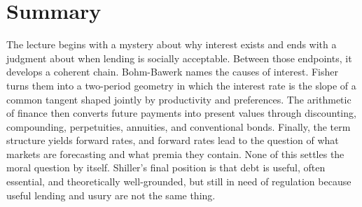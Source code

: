 \section{Summary}

The lecture begins with a mystery about why interest exists and ends with a judgment about when lending is socially acceptable. Between those endpoints, it develops a coherent chain. Bohm-Bawerk names the causes of interest. Fisher turns them into a two-period geometry in which the interest rate is the slope of a common tangent shaped jointly by productivity and preferences. The arithmetic of finance then converts future payments into present values through discounting, compounding, perpetuities, annuities, and conventional bonds. Finally, the term structure yields forward rates, and forward rates lead to the question of what markets are forecasting and what premia they contain. None of this settles the moral question by itself. Shiller's final position is that debt is useful, often essential, and theoretically well-grounded, but still in need of regulation because useful lending and usury are not the same thing.
